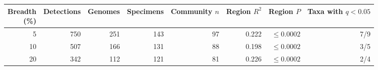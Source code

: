 \begin{tabular}{rrrrrrrr}
\toprule
\shortstack{Breadth\\(\%)} & Detections & Genomes & Specimens &
\shortstack{Community\\$n$} & \shortstack{Region\\$R^2$} &
\shortstack{Region\\$P$} & \shortstack{Taxa with\\$q<0.05$} \\
\midrule
5 & 750 & 251 & 143 & 97 & 0.222 & $\leq 0.0002$ & 7/9 \\
10 & 507 & 166 & 131 & 88 & 0.198 & $\leq 0.0002$ & 3/5 \\
20 & 342 & 112 & 121 & 81 & 0.226 & $\leq 0.0002$ & 2/4 \\
\bottomrule
\end{tabular}
